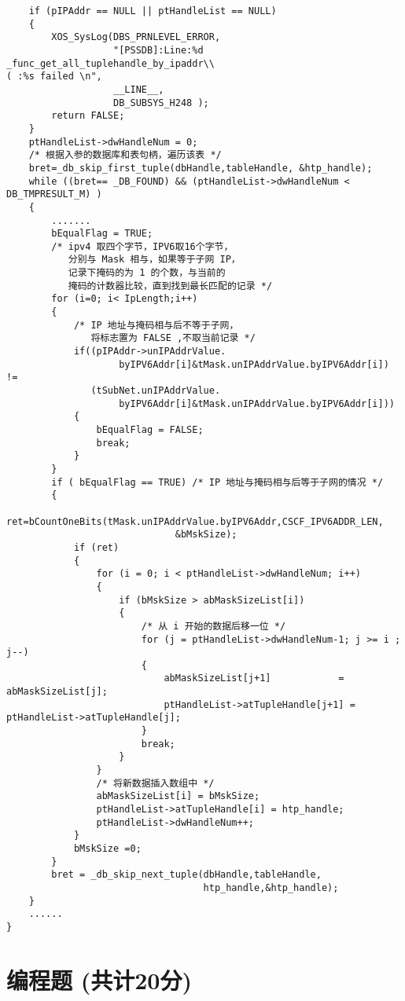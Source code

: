 ﻿\documentclass  [11pt,twocolumn]{article}
\begin{document}
\begin{lstlisting}
    if (pIPAddr == NULL || ptHandleList == NULL)
    {
        XOS_SysLog(DBS_PRNLEVEL_ERROR,
                   "[PSSDB]:Line:%d  _func_get_all_tuplehandle_by_ipaddr\\
( :%s failed \n",
                   __LINE__,
                   DB_SUBSYS_H248 );
        return FALSE;
    }
    ptHandleList->dwHandleNum = 0;
    /* 根据入参的数据库和表句柄，遍历该表 */
    bret=_db_skip_first_tuple(dbHandle,tableHandle, &htp_handle);
    while ((bret== _DB_FOUND) && (ptHandleList->dwHandleNum < DB_TMPRESULT_M) )
    {
        .......
        bEqualFlag = TRUE;
        /* ipv4 取四个字节，IPV6取16个字节，
           分别与 Mask 相与，如果等于子网 IP，
           记录下掩码的为 1 的个数，与当前的
           掩码的计数器比较，直到找到最长匹配的记录 */
        for (i=0; i< IpLength;i++)
        {
            /* IP 地址与掩码相与后不等于子网，
               将标志置为 FALSE ,不取当前记录 */
            if((pIPAddr->unIPAddrValue.
                    byIPV6Addr[i]&tMask.unIPAddrValue.byIPV6Addr[i]) !=
               (tSubNet.unIPAddrValue.
                    byIPV6Addr[i]&tMask.unIPAddrValue.byIPV6Addr[i]))
            {
                bEqualFlag = FALSE;
                break;
            }
        }
        if ( bEqualFlag == TRUE) /* IP 地址与掩码相与后等于子网的情况 */
        {
            ret=bCountOneBits(tMask.unIPAddrValue.byIPV6Addr,CSCF_IPV6ADDR_LEN,
                              &bMskSize);
            if (ret)
            {
                for (i = 0; i < ptHandleList->dwHandleNum; i++)
                {
                    if (bMskSize > abMaskSizeList[i])
                    {
                        /* 从 i 开始的数据后移一位 */
                        for (j = ptHandleList->dwHandleNum-1; j >= i ; j--)
                        {
                            abMaskSizeList[j+1]            = abMaskSizeList[j];
                            ptHandleList->atTupleHandle[j+1] = ptHandleList->atTupleHandle[j];
                        }
                        break;
                    }
                }
                /* 将新数据插入数组中 */
                abMaskSizeList[i] = bMskSize;
                ptHandleList->atTupleHandle[i] = htp_handle;
                ptHandleList->dwHandleNum++;
            }
            bMskSize =0;
        }
        bret = _db_skip_next_tuple(dbHandle,tableHandle,
                                   htp_handle,&htp_handle);
    }
    ......
}
\end{lstlisting}

\section{编程题 (共计20分)}
\end{document}
